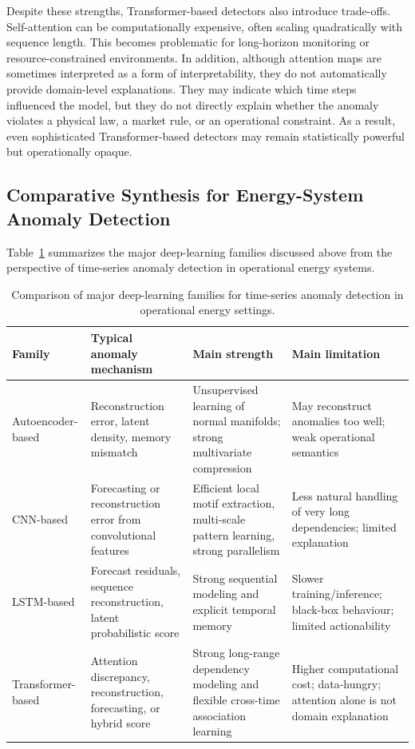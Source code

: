 Despite these strengths, Transformer-based detectors also introduce trade-offs. Self-attention can be computationally expensive, often scaling quadratically with sequence length. This becomes problematic for long-horizon monitoring or resource-constrained environments. In addition, although attention maps are sometimes interpreted as a form of interpretability, they do not automatically provide domain-level explanations. They may indicate which time steps influenced the model, but they do not directly explain whether the anomaly violates a physical law, a market rule, or an operational constraint. As a result, even sophisticated Transformer-based detectors may remain statistically powerful but operationally opaque.

\subsection{Comparative Synthesis for Energy-System Anomaly Detection}

Table~\ref{tab:sota_detector_families} summarizes the major deep-learning families discussed above from the perspective of time-series anomaly detection in operational energy systems.

\begin{table}[H]
	\centering
	\caption{Comparison of major deep-learning families for time-series anomaly detection in operational energy settings.}
	\label{tab:sota_detector_families}
	\small
	\begin{tabular}{|p{2.4cm}|p{3.1cm}|p{2.8cm}|p{3.2cm}|}
		\hline
		\textbf{Family} & \textbf{Typical anomaly mechanism} & \textbf{Main strength} & \textbf{Main limitation} \\
		\hline
		Autoencoder-based & Reconstruction error, latent density, memory mismatch & Unsupervised learning of normal manifolds; strong multivariate compression & May reconstruct anomalies too well; weak operational semantics \\
		\hline
		CNN-based & Forecasting or reconstruction error from convolutional features & Efficient local motif extraction, multi-scale pattern learning, strong parallelism & Less natural handling of very long dependencies; limited explanation \\
		\hline
		LSTM-based & Forecast residuals, sequence reconstruction, latent probabilistic score & Strong sequential modeling and explicit temporal memory & Slower training/inference; black-box behaviour; limited actionability \\
		\hline
		Transformer-based & Attention discrepancy, reconstruction, forecasting, or hybrid score & Strong long-range dependency modeling and flexible cross-time association learning & Higher computational cost; data-hungry; attention alone is not domain explanation \\
		\hline
	\end{tabular}
\end{table}

